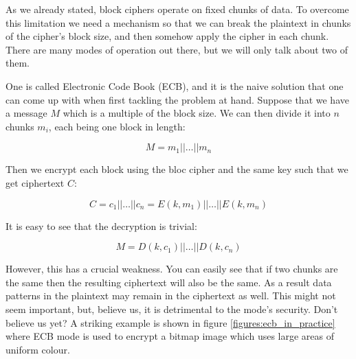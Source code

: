 As we already stated, block ciphers operate on fixed chunks of data.
To overcome this limitation we need a mechanism so that we can break the plaintext in chunks of the cipher's block size, and then somehow apply the cipher in each chunk.
There are many modes of operation out there, but we will only talk about two of them.

One is called Electronic Code Book (ECB), and it is the naive solution that one can come up with when first tackling the problem at hand.
Suppose that we have a message $M$ which is a multiple of the block size.
We can then divide it into $n$ chunks $m_i$, each being one block in length:

\[
  M = m_1 || \dots || m_n
\]

Then we encrypt each block using the bloc cipher and the same key such that we get ciphertext $C$:

\[
  C = c_1 || \dots || c_n =  E(k,m_1) || \dots || E(k,m_n)
\]

It is easy to see that the decryption is trivial:

\[
  M = D(k, c_1) || \dots || D(k, c_n)
\]

However, this has a crucial weakness. You can easily see that if two chunks are the same then the resulting ciphertext will also be the same. As a result data patterns in the plaintext may remain in the ciphertext as well. This might not seem important, but, believe us, it is detrimental to the mode's security. Don't believe us yet? A striking example is shown in figure \ref{figures:ecb_in_practice} where ECB mode is used to encrypt a bitmap image which uses large areas of uniform colour.

